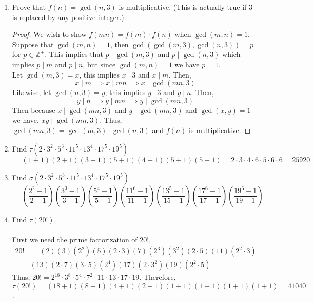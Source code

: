 \documentclass[class=article, crop=false]{standalone}
\def\integers{{\mathbb Z}}
\begin{document}
\begin{enumerate}
\item
  Prove that $f(n)=\gcd(n,3)$ is multiplicative.
  (This is actually true if 3 is replaced by any positive integer.)
  \begin{proof}
	We wish to show $f(mn)=f(m)\cdot f(n)$ when $\gcd(m,n)=1$.
	Suppose that $\gcd(m,n)=1$, then
	$\gcd(\gcd(m,3), \gcd(n,3)) = p$ for $p\in\integers^+$.
	This implies that $p\mid \gcd(m,3)$ and $p\mid\gcd(n,3)$ which implies
	$p\mid m$ and $p\mid n$, but since $\gcd(m,n)=1$ we have $p=1$. \\
	Let $\gcd(m,3)=x$, this implies $x\mid 3$ and $x\mid m$. Then,
	$$x\mid m \implies x\mid mn \implies x\mid \gcd(mn, 3)$$
	Likewise, let $\gcd(n,3)=y$, this implies $y\mid 3$ and $y\mid n$. Then,
	$$y\mid n \implies y\mid mn \implies y\mid \gcd(mn, 3)$$
	Then because $x\mid \gcd(mn,3)$ and $y\mid\gcd(mn,3)$ and $\gcd(x,y)=1$
	we have, $xy\mid \gcd(mn, 3)$.
	Thus, $\gcd(mn,3) = \gcd(m,3)\cdot \gcd(n,3)$ and $f(n)$ is multiplicative.
  \end{proof}

\item
  Find $\tau(2\cdot 3^2\cdot 5^3\cdot 11^5\cdot 13^4\cdot 17^5\cdot 19^5)$
  $$=(1+1)(2+1)(3+1)(5+1)(4+1)(5+1)(5+1) = 2\cdot 3\cdot 4\cdot 6\cdot 5\cdot 6\cdot 6 = 25920$$

\item
  Find $\sigma(2\cdot 3^2\cdot 5^3\cdot 11^5\cdot 13^4\cdot 17^5\cdot 19^5)$
  $$=\left(\frac{2^2 - 1}{2-1}\right)\left(\frac{3^3-1}{3-1}\right)\left(\frac{5^4-1}{5-1}\right)
  \left(\frac{11^6-1}{11-1}\right)\left(\frac{13^5-1}{15-1}\right)\left(\frac{17^6-1}{17-1}\right)
  \left(\frac{19^6-1}{19-1}\right)$$

\item
  Find $\tau(20!)$. \\\\
  First we need the prime factorization of $20!$,
  \begin{align*}
	20! &= \left(2\right) \left(3\right) \left(2^2\right) \left(5\right) \left(2\cdot 3\right)
	\left(7\right) \left(2^3\right) \left(3^2\right) \left(2\cdot 5\right) \left(11\right)
	\left(2^2\cdot 3\right)\\
	& \left(13\right) \left(2\cdot7\right) \left(3\cdot 5\right)
	\left(2^4\right) \left(17\right) \left(2\cdot 3^2\right) \left(19\right) \left(2^2 \cdot 5\right)
  \end{align*}
  Thus, $20! = 2^{18} \cdot 3^8 \cdot 5^4 \cdot 7^2 \cdot 11 \cdot 13 \cdot 17 \cdot 19$.
  Therefore, $\tau(20!)=(18+1)(8+1)(4+1)(2+1)(1+1)(1+1)(1+1)(1+1) = 41040$.


\end{enumerate}
\end{document}
